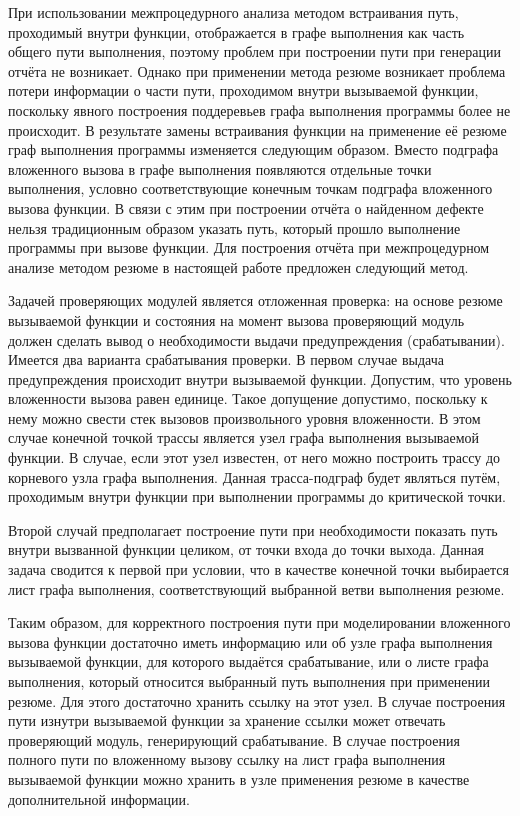 При использовании межпроцедурного анализа методом встраивания путь, проходимый внутри функции, отображается в графе выполнения как часть общего пути выполнения, поэтому проблем при построении пути при генерации отчёта не возникает. Однако при применении метода резюме возникает проблема потери информации о части пути, проходимом внутри вызываемой функции, поскольку явного построения поддеревьев графа выполнения программы более не происходит. В результате замены встраивания функции на применение её резюме граф выполнения программы изменяется следующим образом. Вместо подграфа вложенного вызова в графе выполнения появляются отдельные точки выполнения, условно соответствующие конечным точкам подграфа вложенного вызова функции. В связи с этим при построении отчёта о найденном дефекте нельзя традиционным образом указать путь, который прошло выполнение программы при вызове функции. Для построения отчёта  при межпроцедурном анализе методом резюме в настоящей работе предложен следующий метод.

Задачей проверяющих модулей является отложенная проверка: на основе резюме вызываемой функции и состояния на момент вызова проверяющий модуль должен сделать вывод о необходимости выдачи предупреждения (срабатывании). Имеется два варианта срабатывания проверки. В первом случае выдача предупреждения происходит внутри вызываемой функции. Допустим, что уровень вложенности вызова равен единице. Такое допущение допустимо, поскольку к нему можно свести стек вызовов произвольного уровня вложенности. В этом случае конечной точкой трассы является узел графа выполнения вызываемой функции. В случае, если этот узел известен, от него можно построить трассу до корневого узла графа выполнения. Данная трасса-подграф будет являться путём, проходимым внутри функции при выполнении программы до критической точки.

Второй случай предполагает построение пути при необходимости показать путь внутри вызванной функции целиком, от точки входа до точки выхода. Данная задача сводится к первой при условии, что в качестве конечной точки выбирается лист графа выполнения, соответствующий выбранной ветви выполнения резюме.

Таким образом, для корректного построения пути при моделировании вложенного вызова функции достаточно иметь информацию или об узле графа выполнения вызываемой функции, для которого выдаётся срабатывание, или о листе графа выполнения, который относится выбранный путь выполнения при применении резюме. Для этого достаточно хранить ссылку на этот узел. В случае построения пути изнутри вызываемой функции за хранение ссылки может отвечать проверяющий модуль, генерирующий срабатывание. В случае построения полного пути по вложенному вызову ссылку на лист графа выполнения вызываемой функции можно хранить в узле применения резюме в качестве дополнительной информации.


